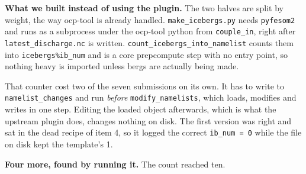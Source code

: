 \documentclass[11pt,a4paper]{article}
\newcommand{\code}[1]{\texttt{\small #1}}
\begin{document}
\medskip\noindent
\textbf{What we built instead of using the plugin.} The two halves are split by weight, the way
ocp-tool is already handled. \code{make\_icebergs.py} needs \code{pyfesom2} and runs as a
subprocess under the ocp-tool python from \code{couple\_in}, right after
\code{latest\_discharge.nc} is written. \code{count\_icebergs\_into\_namelist} counts them into
\code{icebergs\%ib\_num} and is a core prepcompute step with no entry point, so nothing heavy is
imported unless bergs are actually being made.

That counter cost two of the seven submissions on its own. It has to write to
\code{namelist\_changes} and run \emph{before} \code{modify\_namelists}, which loads, modifies and
writes in one step. Editing the loaded object afterwards, which is what the upstream plugin does,
changes nothing on disk. The first version was right and sat in the dead recipe of item 4, so it
logged the correct \code{ib\_num = 0} while the file on disk kept the template's 1.

\medskip\noindent
\textbf{Four more, found by running it.} The count reached ten.
\end{document}
